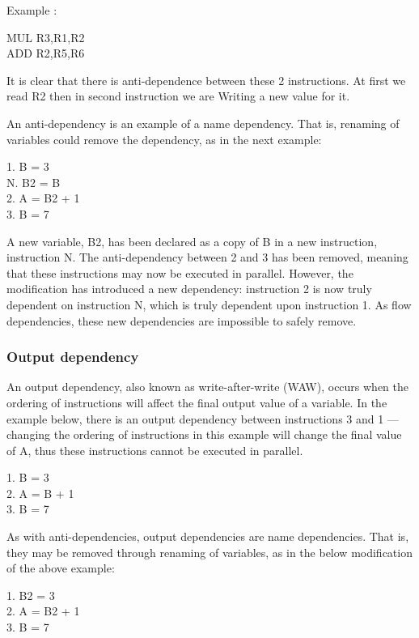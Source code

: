 Example :
\begin{center}
    MUL R3,R1,R2 \\
    ADD R2,R5,R6
    \end{center}
    It is clear that there is anti-dependence between these 2 instructions. At first we read R2 then in second instruction we are Writing a new value for it.

    An anti-dependency is an example of a name dependency. That is, renaming of variables could remove the dependency, as in the next example:
    \begin{center}
        1. B = 3 \\ 
        N. B2 = B \\
        2. A = B2 + 1 \\
        3. B = 7
        \end{center}
    A new variable, B2, has been declared as a copy of B in a new instruction, instruction N. The anti-dependency between 2 and 3 has been removed, meaning that these instructions may now be executed in parallel. However, the modification has introduced a new dependency: instruction 2 is now truly dependent on instruction N, which is truly dependent upon instruction 1. As flow dependencies, these new dependencies are impossible to safely remove. 

\subsubsection{Output dependency}

An output dependency, also known as write-after-write (WAW), occurs when the ordering of instructions will affect the final output value of a variable. In the example below, there is an output dependency between instructions 3 and 1 — changing the ordering of instructions in this example will change the final value of A, thus these instructions cannot be executed in parallel.

\begin{center}
    1. B = 3 \\ 
    2. A = B + 1 \\
    3. B = 7
    \end{center}
As with anti-dependencies, output dependencies are name dependencies. That is, they may be removed through renaming of variables, as in the below modification of the above example:

\begin{center}
    1. B2 = 3 \\
    2. A = B2 + 1 \\
    3. B = 7
\end{center}



